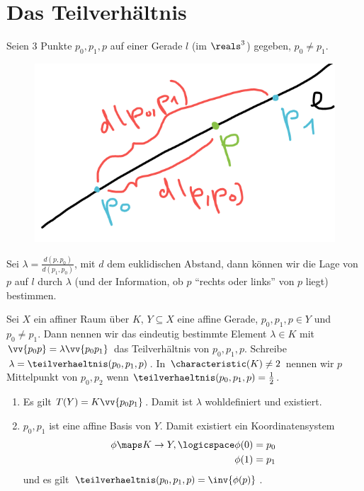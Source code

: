 \section{Das Teilverhältnis}
\begin{idee*}
    Seien 3 Punkte \( p_0,p_1,p \) auf einer Gerade \( l \) (\zb im \( \reals^3 \)) gegeben, \( p_0\neq p_1 \).
    \begin{figure}[H]
        \centering
        \includegraphics[width=0.5\linewidth]{figures/gerade_teilverhaeltnis}
        \caption*{}
        \label{fig:gerade_teilverhaeltnis}
    \end{figure}
    Sei \( \lambda=\frac{d(p,p_0)}{d(p_1,p_0)} \), mit \( d \) dem euklidischen Abstand, dann können wir die Lage von \( p \) auf \( l \) durch \( \lambda \) (und der Information, ob \( p \) \enquote{rechts oder links} von \( p \) liegt) bestimmen.
\end{idee*}
\begin{definition*}
    Sei \( X \) ein affiner Raum über \( K \), \( Y\subseteq X \) eine affine Gerade, \( p_0,p_1,p\in Y \) und \( p_0\neq p_1 \). Dann nennen wir das eindeutig bestimmte Element \( \lambda\in K \) mit \( \vv{p_0 p}=\lambda \vv{p_0 p_1} \) das Teilverhältnis von \( p_0,p_1,p \). Schreibe \( \lambda=\teilverhaeltnis(p_0,p_1,p) \). In \( \characteristic(K)\neq 2 \) nennen wir \( p \) Mittelpunkt von \( p_0,p_2 \) wenn \( \teilverhaeltnis(p_0,p_1,p)=\frac{1}{2} \).
\end{definition*}
\begin{bemerkungen*}
    \begin{enumerate}
        \item Es gilt \( T(Y)=K\vv{p_0p_1} \). Damit ist \( \lambda \) wohldefiniert und existiert.
        \item \( p_0,p_1 \) ist eine affine Basis von \( Y \). Damit existiert ein Koordinatensystem
        \begin{align*}
            \phi\maps K\to Y,\logicspace \begin{aligned}[t]
                \phi(0)&=p_0\\
                \phi(1)&=p_1
            \end{aligned}
        \end{align*}
        und es gilt \( \teilverhaeltnis(p_0,p_1,p)=\inv{\phi(p)} \).
    \end{enumerate}
    
\end{bemerkungen*}
